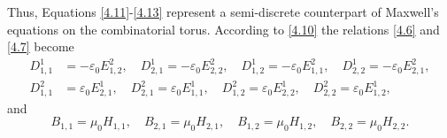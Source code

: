 \documentclass[english]{article}
\theoremstyle{plain}
\theoremstyle{definition}
\theoremstyle{remark}
\numberwithin{equation}{section}
\begin{document}
Thus, Equations \eqref{4.11}-\eqref{4.13} represent a semi-discrete counterpart of Maxwell's equations on the combinatorial torus.
According to \eqref{4.10} the relations \eqref{4.6} and \eqref{4.7} become
\begin{align}\label{4.14}
D^1_{1,1}&= -\varepsilon_0E^2_{1,2}, \quad D^1_{2,1}= -\varepsilon_0E^2_{2,2}, \quad  D^1_{1,2}= -\varepsilon_0E^2_{1,1}, \quad D^1_{2,2}= -\varepsilon_0E^2_{2,1},\nonumber \\
D^2_{1,1}&= \varepsilon_0E^1_{2, 1}, \quad D^2_{2,1}= \varepsilon_0E^1_{1,1}, \quad D^2_{1,2}= \varepsilon_0E^1_{2, 2}, \quad
D^2_{2,2}= \varepsilon_0E^1_{1, 2},
\end{align}
and
\begin{equation}\label{4.15}
     B_{1,1}= \mu_0H_{1, 1}, \quad  B_{2,1}= \mu_0H_{2, 1}, \quad  B_{1,2}= \mu_0H_{1, 2}, \quad  B_{2,2}= \mu_0H_{2,2}.
\end{equation}
\end{document}
